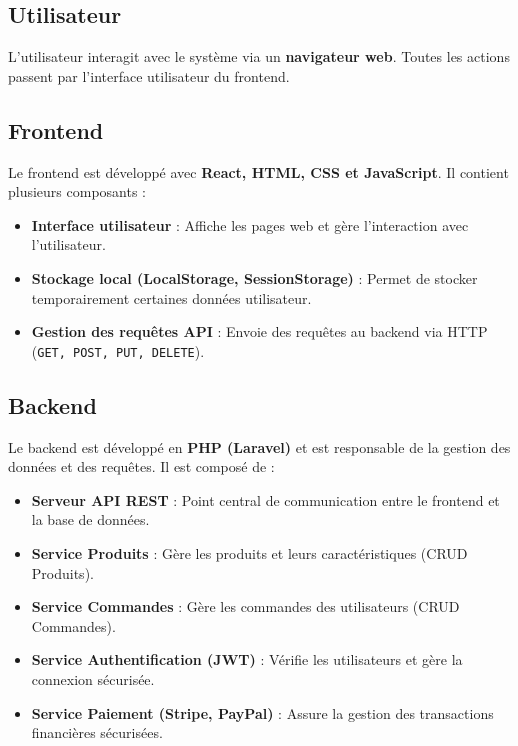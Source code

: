 \documentclass[a4paper,12pt]{article}
\begin{document}
\subsection{Utilisateur}
L'utilisateur interagit avec le système via un \textbf{navigateur web}. Toutes les actions passent par l'interface utilisateur du frontend.

\subsection{Frontend}
Le frontend est développé avec \textbf{React, HTML, CSS et JavaScript}. Il contient plusieurs composants :
\begin{itemize}
    \item \textbf{Interface utilisateur} : Affiche les pages web et gère l’interaction avec l’utilisateur.
    \item \textbf{Stockage local (LocalStorage, SessionStorage)} : Permet de stocker temporairement certaines données utilisateur.
    \item \textbf{Gestion des requêtes API} : Envoie des requêtes au backend via HTTP (\texttt{GET, POST, PUT, DELETE}).
\end{itemize}

\subsection{Backend}
Le backend est développé en \textbf{PHP (Laravel)} et est responsable de la gestion des données et des requêtes. Il est composé de :
\begin{itemize}
    \item \textbf{Serveur API REST} : Point central de communication entre le frontend et la base de données.
    \item \textbf{Service Produits} : Gère les produits et leurs caractéristiques (CRUD Produits).
    \item \textbf{Service Commandes} : Gère les commandes des utilisateurs (CRUD Commandes).
    \item \textbf{Service Authentification (JWT)} : Vérifie les utilisateurs et gère la connexion sécurisée.
    \item \textbf{Service Paiement (Stripe, PayPal)} : Assure la gestion des transactions financières sécurisées.
\end{itemize}
\end{document}
